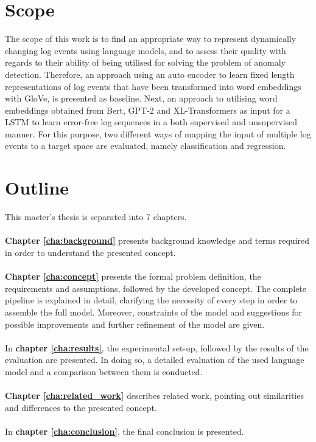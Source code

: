 \section{Scope\label{sec:scope}}
The scope of this work is to find an appropriate way to represent dynamically changing log events using language models, and to assess their quality with regards to their ability of being utilised for solving the problem of anomaly detection. Therefore, an approach using an auto encoder to learn fixed length representations of log events that have been transformed into word embeddings with GloVe, is presented as baseline. Next, an approach to utilising word embeddings obtained from Bert, GPT-2 and XL-Transformers as input for a LSTM to  learn error-free log sequences in a both supervised and unsupervised manner. For this purpose, two different ways of mapping the input of multiple log events to a target space are evaluated, namely classification and regression.


\section{Outline\label{sec:outline}}


This master's thesis is separated into 7 chapters.
\\
\\
\textbf{Chapter \ref{cha:background}} presents background knowledge and terms required in order to understand the presented concept.
\\
\\
\textbf{Chapter \ref{cha:concept}} presents the formal problem definition, the requirements and assumptions, followed by the developed concept. The complete pipeline is explained in detail, clarifying the necessity of every step in order to assemble the full model. Moreover, constraints of the model and suggestions for possible improvements and further refinement of the model are given.
\\
\\
In \textbf{chapter \ref{cha:results}}, the experimental set-up, followed by the results of the evaluation are presented. In doing so, a detailed evaluation of the used language model and a comparison between them is conducted.
\\
\\
\textbf{Chapter \ref{cha:related_work}} describes related work, pointing out similarities and differences to the presented concept.
\\
\\
In \textbf{chapter \ref{cha:conclusion}}, the final conclusion is presented.



